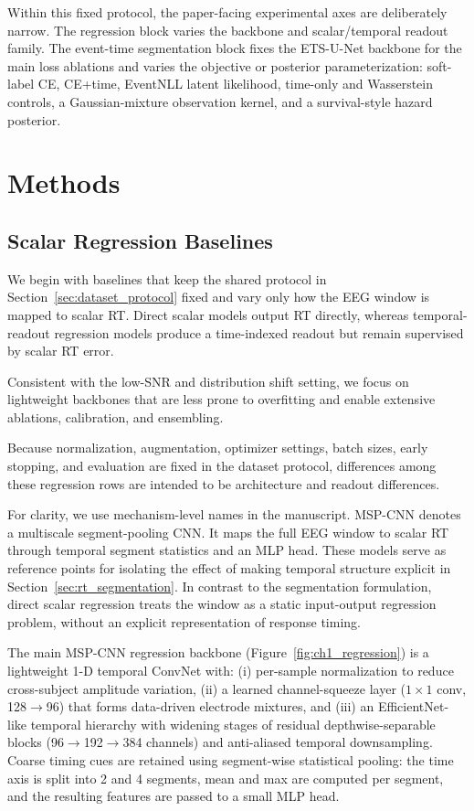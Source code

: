 \documentclass[12pt]{article}
\begin{document}
Within this fixed protocol, the paper-facing experimental axes are deliberately narrow. The regression block varies the backbone and scalar/temporal readout family. The event-time segmentation block fixes the ETS-U-Net backbone for the main loss ablations and varies the objective or posterior parameterization: soft-label CE, CE+time, EventNLL latent likelihood, time-only and Wasserstein controls, a Gaussian-mixture observation kernel, and a survival-style hazard posterior.

\section{Methods}

\subsection{Scalar Regression Baselines}

\label{sec:baseline_regression}

We begin with baselines that keep the shared protocol in Section~\ref{sec:dataset_protocol} fixed and vary only how the EEG window is mapped to scalar RT. Direct scalar models output RT directly, whereas temporal-readout regression models produce a time-indexed readout but remain supervised by scalar RT error.

Consistent with the low-SNR and distribution shift setting, we focus on lightweight backbones that are less prone to overfitting and enable extensive ablations, calibration, and ensembling.

Because normalization, augmentation, optimizer settings, batch sizes, early stopping, and evaluation are fixed in the dataset protocol, differences among these regression rows are intended to be architecture and readout differences.

For clarity, we use mechanism-level names in the manuscript. MSP-CNN denotes a multiscale segment-pooling CNN. It maps the full EEG window to scalar RT through temporal segment statistics and an MLP head. These models serve as reference points for isolating the effect of making temporal structure explicit in Section~\ref{sec:rt_segmentation}. In contrast to the segmentation formulation, direct scalar regression treats the window as a static input-output regression problem, without an explicit representation of response timing.

The main MSP-CNN regression backbone (Figure~\ref{fig:ch1_regression}) is a lightweight 1-D temporal ConvNet with:
(i) per-sample normalization to reduce cross-subject amplitude variation,
(ii) a learned channel-squeeze layer ($1\times1$ conv, 128$\rightarrow$96) that forms data-driven electrode mixtures,
and (iii) an EfficientNet-like temporal hierarchy with widening stages of residual depthwise-separable blocks
(96$\rightarrow$192$\rightarrow$384 channels) and anti-aliased temporal downsampling.
Coarse timing cues are retained using segment-wise statistical pooling: the time axis is split into 2 and 4 segments,
mean and max are computed per segment, and the resulting features are passed to a small MLP head.
\end{document}
